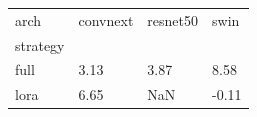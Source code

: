 \begin{tabular}{llll}
\toprule
arch & convnext & resnet50 & swin \\
strategy &  &  &  \\
\midrule
full & 3.13 & 3.87 & 8.58 \\
lora & 6.65 & NaN & -0.11 \\
\bottomrule
\end{tabular}
